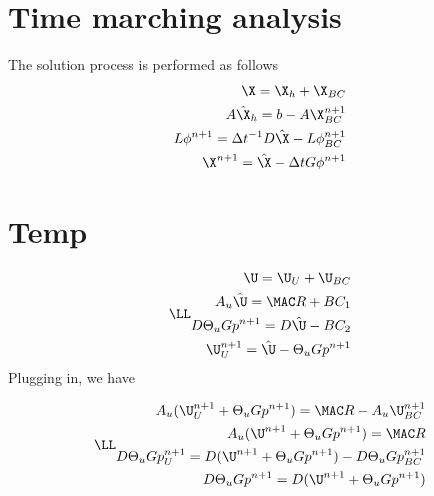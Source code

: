 \documentclass{article}
\newcommand{\PSCHAIN}{..}
\newcommand{\rootdir}{\PSCHAIN}
\begin{document}
\doublespacing
\MOONSTITLE

\section{Time marching analysis}
The solution process is performed as follows
\begin{equation}\begin{aligned}
\X = \X_{h} + \X_{BC} \\
A\hat{\X}_{h} = b - A\X^{n+1}_{BC} \\
L \phi^{n+1} = \Delta t^{-1} D \hat{\X} - L \phi^{n+1}_{BC} \\
\X^{n+1} = \hat{\X} - \Delta t G \phi^{n+1}
\end{aligned} \end{equation}

\section{Temp}
\begin{equation}\LL\begin{aligned}
\U = \U_U+\U_{BC} \\
A_u \hat{\U} = \MAC R + BC_1 \\
D \Theta_u G p^{n+1} = D\hat{\U} - BC_2 \\
\U^{n+1}_U = \hat{\U} - \Theta_u G p^{n+1}
\end{aligned} \end{equation}
Plugging in, we have

\begin{equation}\LL\begin{aligned}
A_u (\U^{n+1}_U + \Theta_u G p^{n+1}) = \MAC R - A_u \U^{n+1}_{BC} \\
A_u (\U^{n+1} + \Theta_u G p^{n+1}) = \MAC R \\
D \Theta_u G p^{n+1}_U = D(\U^{n+1} + \Theta_u G p^{n+1}) - D \Theta_u G p^{n+1}_{BC} \\
D \Theta_u G p^{n+1} = D(\U^{n+1} + \Theta_u G p^{n+1}) \\
\end{aligned} \end{equation}


\end{document}
